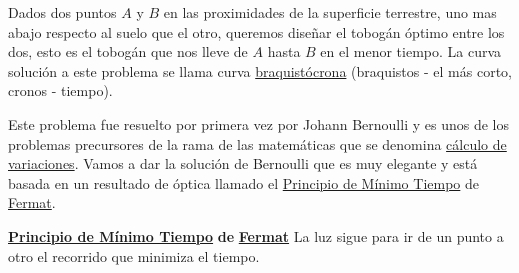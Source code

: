 \begin{problema} Dados dos puntos $A$ y $B$ en las proximidades de la superficie terrestre, uno mas abajo respecto al suelo que el otro,
queremos diseñar el tobogán óptimo entre los dos,
esto es el tobogán que nos lleve de $A$ hasta $B$ en el menor tiempo. La curva solución a este problema se llama curva 
\href{http://es.wikipedia.org/wiki/Curva_braquistócrona}{braquistócrona} (braquistos - el más corto, cronos - tiempo).
\end{problema}\vspace{-1cm}\link
%
%
%


\begin{center}
\end{center}


 Este problema fue resuelto por primera vez por Johann Bernoulli y es unos de los problemas precursores de la rama de las matemáticas que se denomina
\href{http://es.wikipedia.org/wiki/Cálculo_variacional}{cálculo de 
variaciones}. Vamos a dar la solución de Bernoulli que es muy elegante y está basada en un resultado de óptica llamado 
 el \href{http://es.wikipedia.org/wiki/Principio_de_Fermat}{Principio de Mínimo Tiempo} de \href{http://es.wikipedia.org/wiki/Fermat}{Fermat}.

\begin{boite}[boxcolor=orange, background=blue!5, titlebackground=blue!20,
titleboxcolor = black]{\href{http://es.wikipedia.org/wiki/Principio_de_Fermat}{\textbf {Principio de Mínimo Tiempo}} \textbf{de} \href{http://es.wikipedia.org/wiki/Fermat}{\textbf{Fermat}}}
 La luz sigue para ir de un punto a otro el recorrido que minimiza el tiempo.
\end{boite}



